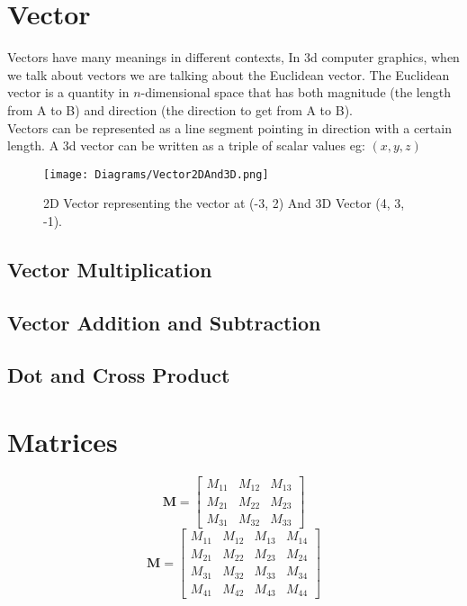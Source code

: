 \section{Vector}

Vectors have many meanings in different contexts, In \acrshort{3d} computer graphics, when we talk about vectors we are talking about the Euclidean vector. The Euclidean vector is a quantity in $n$-dimensional space that has both magnitude (the length from A to B) and direction (the direction to get from A to B). \\
Vectors can be represented as a line segment pointing in direction with a certain length. A \acrshort{3d} vector can be written as a triple of scalar values eg: $(x, y, z)$

\begin{figure}[htbp]
	{\centering
		\vspace{7px}
		\texttt{[image: Diagrams/Vector2DAnd3D.png]}
		\caption{2D Vector representing the vector at (-3, 2) And 3D Vector (4, 3, -1).}
		\label{3DAxisFigure}
	}
\end{figure}
\FloatBarrier

\subsection{Vector Multiplication}

\subsection{Vector Addition and Subtraction}

\subsection{Dot and Cross Product}

\section{Matrices}


\begin{equation}
\textbf{M} = \begin{bmatrix}
M_{11} & M_{12} & M_{13} \\
M_{21} & M_{22} & M_{23} \\
M_{31} & M_{32} & M_{33}
\end{bmatrix}
\end{equation}
\begin{equation}
\textbf{M} = \begin{bmatrix}
M_{11} & M_{12} & M_{13} & M_{14}\\
M_{21} & M_{22} & M_{23} & M_{24}\\
M_{31} & M_{32} & M_{33} & M_{34}\\
M_{41} & M_{42} & M_{43} & M_{44}
\end{bmatrix}
\end{equation}

